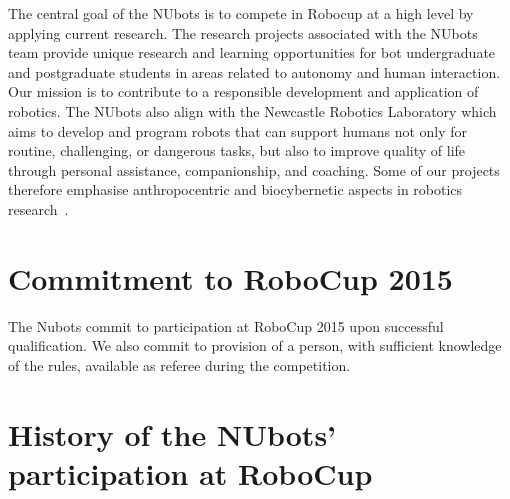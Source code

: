 \documentclass{llncs}
\begin{document}
The central goal of the NUbots is to compete in Robocup at a high level by applying current research. The research projects associated with the NUbots team provide unique research and learning opportunities for bot undergraduate and postgraduate students in areas related to autonomy and human interaction. Our mission is to contribute to a responsible development and application of robotics. The NUbots also align with the Newcastle Robotics Laboratory which aims to develop and program robots that can support humans not only for routine, challenging, or dangerous tasks, but also to improve quality of life through personal assistance, companionship, and coaching. Some of our projects therefore emphasise anthropocentric and biocybernetic
aspects in robotics research~\cite{ChalupOstwald2009}.


\section{Commitment to RoboCup 2015}
The Nubots commit to participation at RoboCup 2015 upon successful qualification. We also commit to provision of a person, with sufficient knowledge of the rules, available as referee during the competition.

\section{History of the NUbots' participation at RoboCup}
\end{document}
